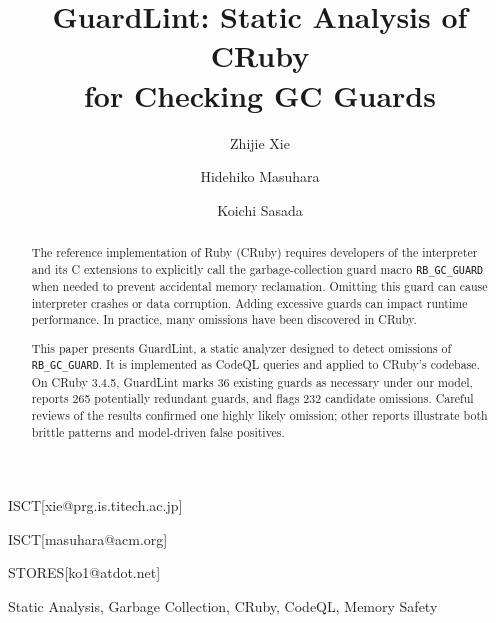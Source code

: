 \documentclass[PRO,english]{ipsj}
\begin{document}
\title{GuardLint: Static Analysis of CRuby\\
for Checking GC Guards}


\author{Zhijie Xie}{ISCT}[xie@prg.is.titech.ac.jp]
\author{Hidehiko Masuhara}{ISCT}[masuhara@acm.org]
\author{Koichi Sasada}{STORES}[ko1@atdot.net]

\begin{abstract}
The reference implementation of Ruby (CRuby) requires developers of the interpreter and its C extensions to explicitly call the garbage-collection guard macro \texttt{RB\_GC\_GUARD} when needed to prevent accidental memory reclamation. Omitting this guard can cause interpreter crashes or data corruption. Adding excessive guards can impact runtime performance. In practice, many omissions have been discovered in CRuby.

This paper presents GuardLint, a static analyzer designed to detect omissions of \texttt{RB\_GC\_GUARD}. It is implemented as CodeQL queries and applied to CRuby's codebase. On CRuby 3.4.5, GuardLint marks 36 existing guards as necessary under our model, reports 265 potentially redundant guards, and flags 232 candidate omissions. Careful reviews of the results confirmed one highly likely omission; other reports illustrate both brittle patterns and model-driven false positives.
\end{abstract}

\begin{keyword}
Static Analysis, Garbage Collection, CRuby, CodeQL, Memory Safety
\end{keyword}

\maketitle















\begin{biography}
\end{biography}
\end{document}
